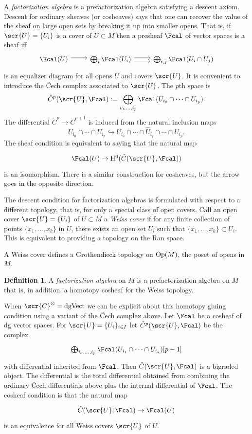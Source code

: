 \documentclass[12pt]{amsart}
\theoremstyle{definition}
\newtheorem{dfn}[theorem]{Definition}
\theoremstyle{remark}
\def\tensor{\otimes}
\def\Hat{\widehat}
\begin{document}
A {\it factorization algebra} is
a prefactorization algebra satisfying a descent axiom. Descent for
ordinary sheaves (or cosheaves) says that one can recover the value of
the sheaf on large open sets by breaking it up into smaller
opens. That is, if $\scr{U} = \{U_i\}$ is a cover of $U \subset M$
then a presheaf $\Fcal$ of vector spaces is a sheaf iff 
\[
\begin{tikzcd}
\Fcal(U) \arrow[r, shift left] & \bigoplus_i \Fcal(U_i)
\arrow[r, shift left] \arrow[r, shift right] & \bigoplus_{i,j} \Fcal(U_i \cap U_j) 
\end{tikzcd}
\]
is an equalizer diagram for all opens $U$ and covers $\scr{U}$. It is convenient to introduce the \v{C}ech
complex associated to $\scr{U}$. The $p$th space is
\[
\check{C}^p(\scr{U},\Fcal) := \bigoplus_{i_0,\ldots,i_p}
\Fcal(U_{i_0} \cap \cdots \cap U_{i_p}) .
\]
The differential $\check{C}^p \to \check{C}^{p+1}$ is induced from the
natural inclusion maps $$U_{i_0} \cap \cdots \cap U_{i_p}
\hookrightarrow U_{i_0} \cap \cdots \cap \Hat{U}_{i_j} \cap \cdots
\cap U_{i_p}. $$ The sheaf condition is equivalent to saying that the
natural map
\[
\begin{tikzcd}
\Fcal(U) \to {\rm H}^0(\check{C}(\scr{U},\Fcal)) 
\end{tikzcd}
\]
is an isomorphism. There is a similar construction for cosheaves, but
the arrow goes in the opposite direction. 

The descent condition for factorization algebras is formulated with respect to a different topology, that is, for
only a special class of open covers. Call an open cover $\scr{U} = \{U_i\}$ of
$U \subset M$ a {\it Weiss cover} if for any finite collection of points
$\{x_1,\ldots,x_k\}$ in $U$, there exists an open set $U_i$ such that
$\{x_1,\ldots,x_k\} \subset U_i$. This is equivalent to providing a
topology on the Ran space. 

A Weiss cover defines a Grothendieck topology on ${\rm
    Op}(M)$, the poset of opens in $M$. 
    
\begin{dfn}    
    A {\it factorization algebra}
  on $M$
  is a prefactorization algebra on $M$ that is, in addition, a
  homotopy cosheaf for the Weiss topology. 
\end{dfn}  

When $\scr{C}^\tensor = {\rm dgVect}$ we can be explicit about this
homotopy gluing condition using a variant of the \v{C}ech complex
above. Let $\Fcal$ be a cosheaf of dg vector spaces. For $\scr{U} = \{U_i\}_{i \in I}$ let
$\check{C}^p(\scr{U}, \Fcal)$ be the complex
\[
\begin{tikzcd}
\bigoplus_{i_0,\ldots,i_p} \Fcal(U_{i_1} \cap \cdots \cap U_{i_k})
[p-1] 
\end{tikzcd}
\]
with differential inherited from $\Fcal$. Then
$\check{C}(\scr{U},\Fcal)$ is a bigraded object. The differential is the total differential obtained from
combining the ordinary
\v{C}ech differentials above plus the internal differential of
$\Fcal$. The cosheaf
condition is that the natural map
\[
\begin{tikzcd}
\check{C}(\scr{U},\Fcal) \to \Fcal(U)
\end{tikzcd}
\]
is an equivalence for all Weiss covers $\scr{U}$ of $U$. 
\end{document}
